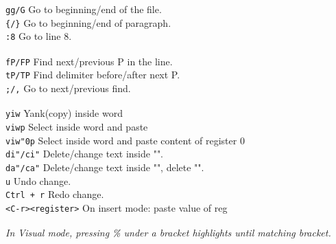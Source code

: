 \documentclass[10pt,landscape]{article}
\makeatletter
\renewcommand{\section}{\@startsection{section}{1}{0mm}%
                                {-1ex plus -.5ex minus -.2ex}%
                                {0.5ex plus .2ex}%
                                {\normalfont\large\bfseries}}
\makeatother
\begin{document}
\begin{multicols}{3}
\verb!gg/G! \hfill Go to beginning/end of the file.\\
\verb!{/}! \hfill Go to beginning/end of paragraph.\\ 
\verb!:8! \hfill Go to line 8.\\
\verb! !\\
\verb!fP/FP! \hfill Find next/previous P in the line.\\
\verb!tP/TP! \hfill Find delimiter before/after next P.\\
\verb!;/,! \hfill Go to next/previous find.\\
\verb! !\\
\verb!yiw! \hfill Yank(copy) inside word\\
\verb!viwp! \hfill Select inside word and paste\\
\verb!viw"0p! \hfill Select inside word and paste content of register 0\\
\verb!di"/ci"! \hfill Delete/change text inside "".\\
\verb!da"/ca"! \hfill Delete/change text inside "", delete "".\\
\verb!u! \hfill Undo change.\\
\verb!Ctrl + r! \hfill Redo change.\\
\verb!<C-r><register>! \hfill On insert mode: paste value of reg\\
\verb! !\\
\textit{In Visual mode, pressing \% under a bracket highlights until matching bracket.}\\
\columnbreak



\end{multicols}
\end{document}
